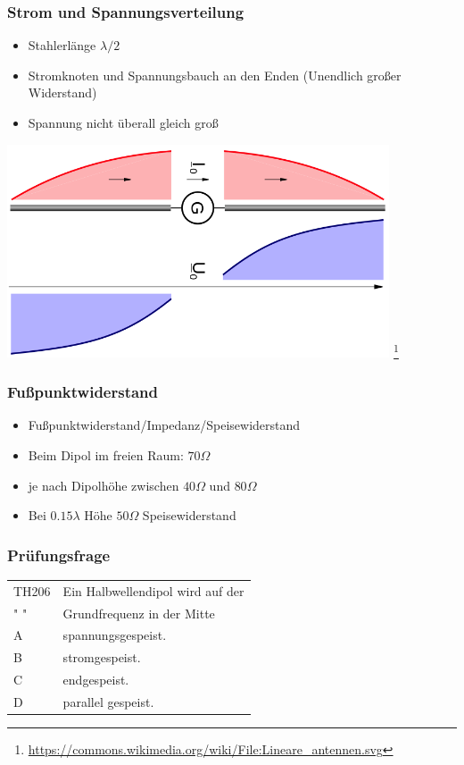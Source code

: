 \begin{frame}
    \frametitle{Strom und Spannungsverteilung}
	\begin{itemize}
		\item Stahlerlänge $\lambda / 2$
		\item Stromknoten und Spannungsbauch an den Enden (Unendlich großer Widerstand)
        \item Spannung nicht überall gleich groß
    \end{itemize}
    \begin{center}
        \includegraphics[width=0.85\textwidth]{e11/DipolUI.png}
        \footnote{\tiny \url{https://commons.wikimedia.org/wiki/File:Lineare_antennen.svg}}
	\end{center}
\end{frame}

\begin{frame}
    \frametitle{Fußpunktwiderstand}
    \begin{center}
	\begin{itemize}
		\item Fußpunktwiderstand/Impedanz/Speisewiderstand
		\item Beim Dipol im freien Raum: $70 \Omega$
		\item je nach Dipolhöhe zwischen $40  \Omega$ und $80  \Omega$
		\item  Bei $0.15 \lambda$ Höhe $50  \Omega$ Speisewiderstand 
    \end{itemize}
 	\end{center}
\end{frame}

\begin{frame}
    \frametitle{Prüfungsfrage}
    \begin{center}
    \begin{tabular}{l||l}\hline
        TH206 & Ein Halbwellendipol wird auf der  \\
         " "  & Grundfrequenz in der Mitte \\ \hline\hline
         A & spannungsgespeist.\\\hline
         B & stromgespeist. \\\hline
         C & endgespeist. \\ \hline
         D & parallel gespeist.\\\hline
    \end{tabular}
 	\end{center}
\end{frame}

